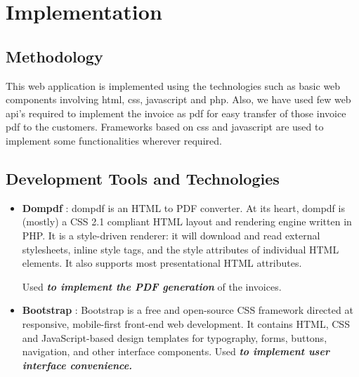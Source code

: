 \chapter{Implementation}
\section{Methodology}
This web application is implemented using the technologies such as basic web components involving html, css, javascript and php. Also, we have used few web api's required to implement the invoice as pdf for easy transfer of those invoice pdf to the customers. Frameworks based on css and javascript are used to implement some functionalities wherever required.
\section{Development Tools and Technologies}
\begin{itemize}
\item \textbf{Dompdf} : dompdf is an HTML to PDF converter. At its heart, dompdf is (mostly) a CSS 2.1 compliant HTML layout and rendering engine written in PHP. It is a style-driven renderer: it will download and read external stylesheets, inline style tags, and the style attributes of individual HTML elements. It also supports most presentational HTML attributes.

Used \textbf{\textit{to implement the PDF generation}} of the invoices.

\item \textbf{Bootstrap} : Bootstrap is a free and open-source CSS framework directed at responsive, mobile-first front-end web development. It contains HTML, CSS and JavaScript-based design templates for typography, forms, buttons, navigation, and other interface components.
Used \textbf{\textit{to implement user interface convenience.}}

\end{itemize}


